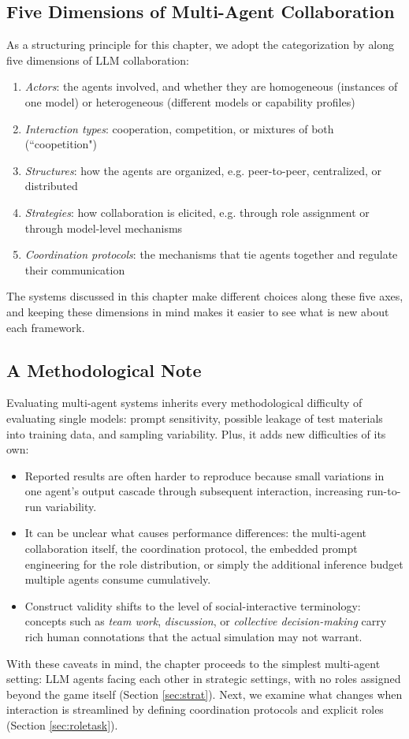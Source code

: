 \subsection{Five Dimensions of Multi-Agent Collaboration} \label{fivedimensions}
As a structuring principle for this chapter, we adopt the categorization by \citet{tran2025multi} along five dimensions of LLM collaboration: 
\begin{enumerate}
    \item \emph{Actors}: the agents involved, and whether they are homogeneous (instances of one model) or heterogeneous (different models or capability profiles)
    \item \emph{Interaction types}: cooperation, competition, or mixtures of both (``coopetition")
    \item \emph{Structures}: how the agents are organized, e.g. peer-to-peer, centralized, or distributed
    \item \emph{Strategies}: how collaboration is elicited, e.g. through role assignment or through model-level mechanisms
    \item \emph{Coordination protocols}: the mechanisms that tie agents together and regulate their communication
\end{enumerate}
The systems discussed in this chapter make different choices along these five axes, and keeping these dimensions in mind makes it easier to see what is new about each framework.

\subsection{A Methodological Note}
Evaluating multi-agent systems inherits every methodological difficulty of evaluating single models: prompt sensitivity, possible leakage of test materials into training data, and sampling variability. Plus, it adds new difficulties of its own: 
\begin{itemize}
    \item Reported results are often harder to reproduce because small variations in one agent's output cascade through subsequent interaction, increasing run-to-run variability.
    \item It can be unclear what causes performance differences: the multi-agent collaboration itself, the coordination protocol, the embedded prompt engineering for the role distribution, or simply the additional inference budget multiple agents consume cumulatively.
    \item Construct validity shifts to the level of social-interactive terminology: concepts such as {\em team work}, {\em discussion}, or {\em collective decision-making} carry rich human connotations that the actual simulation may not warrant.
\end{itemize}
With these caveats in mind, the chapter proceeds to the simplest multi-agent setting: LLM agents facing each other in strategic settings, with no roles assigned beyond the game itself (Section \ref{sec:strat}). Next, we examine what changes when interaction is streamlined by defining coordination protocols and explicit roles (Section \ref{sec:roletask}).

